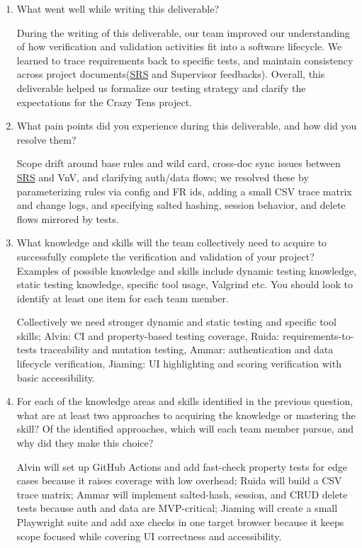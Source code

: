 \documentclass[12pt, titlepage]{article}
\begin{document}
\begin{enumerate}
  \item What went well while writing this deliverable? 

During the writing of this deliverable, our team improved our understanding of how verification and validation activities fit into a software lifecycle.  We learned to trace requirements back to specific tests, and maintain consistency across project documents(\href{../SRS/SRS.pdf}{SRS} and Supervisor feedbacks). Overall, this deliverable helped us formalize our testing strategy and clarify the expectations for the Crazy Tens project.
  \item What pain points did you experience during this deliverable, and how
    did you resolve them?


Scope drift around base rules and wild card, cross-doc sync issues between \href{../SRS/SRS.pdf}{SRS} and VnV, and clarifying auth/data flows; we resolved these by parameterizing rules via config and FR ids, adding a small CSV trace matrix and change logs, and specifying salted hashing, session behavior, and delete flows mirrored by tests.
  \item What knowledge and skills will the team collectively need to acquire to
  successfully complete the verification and validation of your project?
  Examples of possible knowledge and skills include dynamic testing knowledge,
  static testing knowledge, specific tool usage, Valgrind etc.  You should look to
  identify at least one item for each team member.

Collectively we need stronger dynamic and static testing and specific tool skills; Alvin: CI and property-based testing coverage, Ruida: requirements-to-tests traceability and mutation testing, Ammar: authentication and data lifecycle verification, Jiaming: UI highlighting and scoring verification with basic accessibility.
  \item For each of the knowledge areas and skills identified in the previous
  question, what are at least two approaches to acquiring the knowledge or
  mastering the skill?  Of the identified approaches, which will each team
  member pursue, and why did they make this choice?

Alvin will set up GitHub Actions and add fast-check property tests for edge cases because it raises coverage with low overhead; Ruida will build a CSV trace matrix; Ammar will implement salted-hash, session, and CRUD delete tests because auth and data are MVP-critical; Jiaming will create a small Playwright suite and add axe checks in one target browser because it keeps scope focused while covering UI correctness and accessibility.
\end{enumerate}
\end{document}
